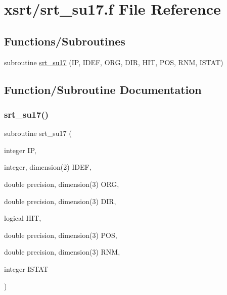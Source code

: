 \hypertarget{srt__su17_8f}{}\section{xsrt/srt\+\_\+su17.f File Reference}
\label{srt__su17_8f}
\subsection*{Functions/\+Subroutines}
\begin{DoxyCompactItemize}
\item 
subroutine \hyperlink{srt__su17_8f_a6db12847bcf8e2a92c5c4336d50fa840}{srt\+\_\+su17} (IP, I\+D\+EF, O\+RG, D\+IR, H\+IT, P\+OS, R\+NM, I\+S\+T\+AT)
\end{DoxyCompactItemize}


\subsection{Function/\+Subroutine Documentation}
\mbox{\label{srt__su17_8f_a6db12847bcf8e2a92c5c4336d50fa840}} 
\subsubsection{\texorpdfstring{srt\+\_\+su17()}{srt\_su17()}}
{\footnotesize\ttfamily subroutine srt\+\_\+su17 (\begin{DoxyParamCaption}\item[{integer}]{IP,  }\item[{integer, dimension(2)}]{I\+D\+EF,  }\item[{double precision, dimension(3)}]{O\+RG,  }\item[{double precision, dimension(3)}]{D\+IR,  }\item[{logical}]{H\+IT,  }\item[{double precision, dimension(3)}]{P\+OS,  }\item[{double precision, dimension(3)}]{R\+NM,  }\item[{integer}]{I\+S\+T\+AT }\end{DoxyParamCaption})}


